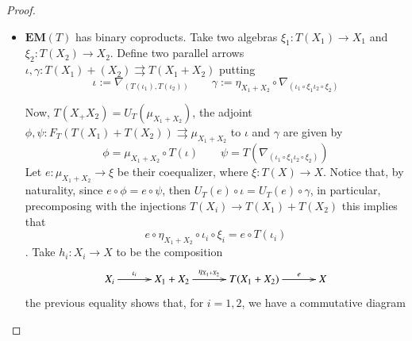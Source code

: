 \documentclass[12pt]{article}
\newtheorem*{claim*}{Claim}
\theoremstyle{definition}
\newcommand{\Set}{\textbf{\textup{Set}}}
\newcommand{\eim}[1]{\mathbf{EM}{(#1)}}
\numberwithin{equation}{section}
\begin{document}
\begin{proof}
\begin{itemize}
	\begin{claim*}
		Let $\psi:\xi_2\rightarrow \beta$ be a morphism in $\eim{T}$, then $\psi\circ i_1=\psi \circ i_2$ if and only if $\psi \circ f=\psi \circ g$.
	\end{claim*}
\begin{proof}
	$(\Rightarrow)$ By construction there exists $\phi: X\times X\rightarrow E_{(f,g)}$ such that 
	\[\Delta_{(f,g)}=i\circ \phi=\Delta_{(i_1\circ \phi, i_2\circ \phi)}\]
 which implies $f=i_1\circ \phi$ and $g=i_2\circ \phi$, therefore
	\[\psi \circ f=\psi\circ (i_1\circ \phi)=(\psi\circ i_1)\circ \phi= (\psi\circ i_2)\circ \phi = \psi \circ (i_2\circ \phi)=\psi \circ g\]

	\noindent $(\Leftarrow)$ Define
	\[K=\{(x,y)\in Y \mid \psi(x)=\psi(y)\}\]
	then $K$, with the restriction of the two projections, is the kernel pair of $\psi$ in $\Set$ and, by Proposition $\ref{limcolim}$, there exists
	$\kappa: T(K)\rightarrow K$ which is the kernel pair of $\psi$ in $\eim{T}$. Notice that $K$ is an equivalence relation which, by hypothesis, contains the image of $\Delta_{(f,g)}$, thus $E_{(f,g)}\subseteq K$, but then $\psi\circ i_1=\psi\circ i_2$.
\end{proof}
	
	\item $\eim{T}$ has binary coproducts. Take two algebras $\xi_1:T(X_1)\rightarrow X_1$ and $\xi_2:T(X_2)\rightarrow X_2$. Define two parallel arrows $\iota, \gamma:T(X_1)+(X_2)\rightrightarrows T(X_1+X_2)$ putting
	\[\iota:=\nabla_{(T(\iota_1), T(\iota_2))} \qquad \gamma:=\eta_{X_1+X_2}\circ \nabla_{(\iota_1\circ \xi_1 \iota_2\circ \xi_2)}
	\]
	
	Now, $T(X_+X_2)=U_T(\mu_{X_1+X_2})$, the adjoint $\phi, \psi:F_T(T(X_1)+T(X_2))\rightrightarrows \mu_{X_1+X_2}$ to $\iota$ and $\gamma$ are given by
	\[ \phi=\mu_{X_1+X_2}\circ T(\iota) \qquad \psi=T(\nabla_{(\iota_1\circ \xi_1 \iota_2\circ \xi_2)})
	\]
	Let $e:\mu_{X_1+X_2}\rightarrow \xi$ be their coequalizer, where $\xi:T(X)\rightarrow X$. Notice that, by naturality, since $e\circ \phi =e\circ \psi$, then $U_T(e)\circ \iota=U_T(e)\circ \gamma $, in particular, precomposing with the injections $T(X_i)\rightarrow T(X_1)+T(X_2)$ this implies that
	\[e\circ \eta_{X_1+X_2}\circ \iota_i\circ \xi_i= e \circ T(\iota_i)\]. Take  $h_i:X_i\rightarrow X$ to be the composition
	\[\xymatrix@C=30pt{X_i\ar[r]^-{\iota_i}&{X_1+X_2}\ar[r]^-{\eta_{X_1+X_2}}& T(X_1+X_2)\ar[r]^-{e} & X}
	\] 
	the previous equality shows that, for $i=1,2$, we have a commutative diagram
	

\end{itemize}
\end{proof}
\end{document}
